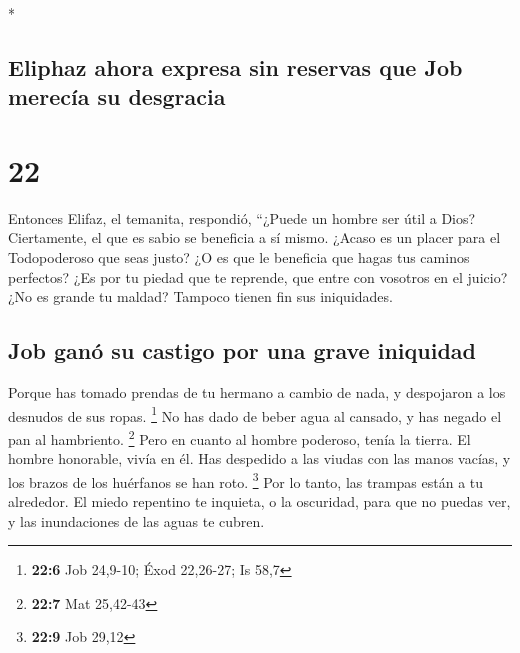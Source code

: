 \begin{paracol}{2}
\begin{otherlanguage}{english}
\end{otherlanguage}

\switchcolumn[0]*

\hypertarget{eliphaz-ahora-expresa-sin-reservas-que-job-merecuxeda-su-desgracia}{%
\subsection{Eliphaz ahora expresa sin reservas que Job merecía su
desgracia}\label{eliphaz-ahora-expresa-sin-reservas-que-job-merecuxeda-su-desgracia}}

\hypertarget{section-42}{%
\section{22}\label{section-42}}

 Entonces Elifaz, el temanita, respondió, 
``¿Puede un hombre ser útil a Dios? Ciertamente, el que es sabio se
beneficia a sí mismo.  ¿Acaso es un placer para el
Todopoderoso que seas justo? ¿O es que le beneficia que hagas tus
caminos perfectos?  ¿Es por tu piedad que te reprende, que
entre con vosotros en el juicio?  ¿No es grande tu maldad?
Tampoco tienen fin sus iniquidades.

\hypertarget{job-ganuxf3-su-castigo-por-una-grave-iniquidad}{%
\subsection{Job ganó su castigo por una grave
iniquidad}\label{job-ganuxf3-su-castigo-por-una-grave-iniquidad}}

 Porque has tomado prendas de tu hermano a cambio de nada,
y despojaron a los desnudos de sus ropas. \footnote{\textbf{22:6} Job
  24,9-10; Éxod 22,26-27; Is 58,7}  No has dado de beber
agua al cansado, y has negado el pan al hambriento. \footnote{\textbf{22:7}
  Mat 25,42-43}  Pero en cuanto al hombre poderoso, tenía
la tierra. El hombre honorable, vivía en él.  Has
despedido a las viudas con las manos vacías, y los brazos de los
huérfanos se han roto. \footnote{\textbf{22:9} Job 29,12}
 Por lo tanto, las trampas están a tu alrededor. El miedo
repentino te inquieta,  o la oscuridad, para que no
puedas ver, y las inundaciones de las aguas te cubren.

\hypertarget{job-ha-pecado-gravemente-contra-dios-por-convicciones-impuxedas-y-por-discursos-inicuos}{%
}
\end{paracol}
